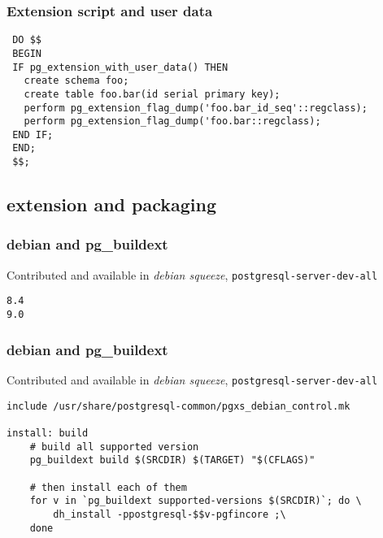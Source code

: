 \documentclass[english]{beamer}
\begin{document}
\begin{frame}[fragile]
  \frametitle{Extension script and user data}

  \begin{example}
\begin{verbatim}
 DO $$
 BEGIN
 IF pg_extension_with_user_data() THEN
   create schema foo;
   create table foo.bar(id serial primary key);
   perform pg_extension_flag_dump('foo.bar_id_seq'::regclass);
   perform pg_extension_flag_dump('foo.bar::regclass);
 END IF;
 END;
 $$;
\end{verbatim}
  \end{example}  
\end{frame}

\subsection{extension and packaging}

\begin{frame}[fragile]
  \frametitle{debian and pg\_buildext}

  Contributed and available in \textit{debian squeeze},
  \texttt{postgresql-server-dev-all}
  \linebreak

  \begin{example}
\begin{verbatim}
8.4
9.0
\end{verbatim}
  \end{example}
\end{frame}

\begin{frame}[fragile]
  \frametitle{debian and pg\_buildext}

  Contributed and available in \textit{debian squeeze},
  \texttt{postgresql-server-dev-all}
  \linebreak

  \begin{example}
\begin{verbatim}
include /usr/share/postgresql-common/pgxs_debian_control.mk

install: build
	# build all supported version
	pg_buildext build $(SRCDIR) $(TARGET) "$(CFLAGS)"

	# then install each of them
	for v in `pg_buildext supported-versions $(SRCDIR)`; do \
		dh_install -ppostgresql-$$v-pgfincore ;\
	done
\end{verbatim}
  \end{example}
\end{frame}
\end{document}
